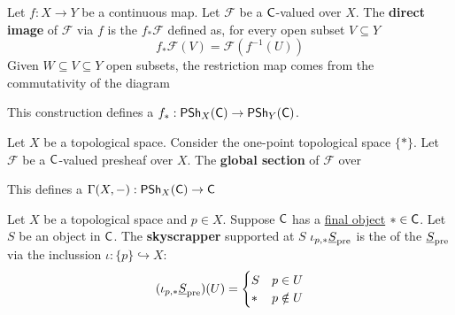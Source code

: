 \documentclass[../main.tex]{subfiles}
\begin{document}
\begin{definition} \label{def:direct-image-presheaf}
  Let \(f: X \to Y\) be a continuous map.
  Let \(\mathcal{F}\) be a \(\mathsf{C}\)-valued  over \(X\).
  The \textbf{direct image } of \(\mathcal{F}\) via \(f\) is the  \(f_{\ast}\mathcal{F}\) defined as, for every open subset \(V \subseteq Y\)
  \begin{equation*}
    f_{\ast}\mathcal{F}(V) = \mathcal{F}(f^{-1}(U))
  \end{equation*}
  Given \(W \subseteq V \subseteq Y\) open subsets, the restriction map comes from the commutativity of the diagram
  \begin{center}
  \end{center}

  This construction defines a  \(f_{\ast}: \mathsf{PSh}_{X}(\mathsf{C}) \to \mathsf{PSh}_{Y}(\mathsf{C})\).
\end{definition}



\begin{example} \label{ex:global-section-presheaf}
  Let \(X\) be a topological space.
  Consider the one-point topological space \(\{\ast\}\).
  Let \(\mathcal{F}\) be a \(\mathsf{C}\)-valued presheaf over \(X\).
  The \textbf{global section} of \(\mathcal{F}\) over

  This defines a  \(\Gamma(X, -): \mathsf{PSh}_{X}(\mathsf{C}) \to \mathsf{C}\)
\end{example}

\begin{example} \label{ex:skyscrapper-presheaf}
  Let \(X\) be a topological space and \(p \in X\).
  Suppose \(\mathsf{C}\) has a \hyperref[def:initial-terminal-objects]{final object} \(\ast \in \mathsf{C}\).
  Let \(S\) be an object in \(\mathsf{C}\).
  The \textbf{skyscrapper } supported at \(S\) \(\iota_{p, \ast}\underline{S}_{\operatorname*{pre}}\) is the  of the  \(\underline{S}_{\operatorname*{pre}}\) via the inclussion \(\iota: \{p\} \hookrightarrow X\):
  \begin{equation*}
    (\iota_{p, \ast}\underline{S}_{\operatorname*{pre}})(U) = \begin{cases}
      S & p \in U \\
      \ast & p \notin U
    \end{cases}
  \end{equation*}
\end{example}
\end{document}
